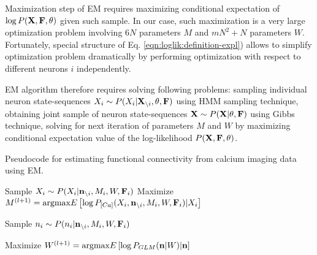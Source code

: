 Maximization step of EM requires maximizing conditional expectation of $\log P({\bf X}, {\bf F}, \mathbf{\theta})$ given such sample. In our case, such maximization is a very large optimization problem involving $6N$ parameters $M$ and $mN^2+N$ parameters $W$. Fortunately, special structure of Eq. \eqref{eqn:loglik:definition-expl}) allows to simplify optimization problem dramatically by performing optimization with respect to different neurons $i$ independently.

EM algorithm therefore requires solving following problems: sampling individual neuron state-sequences $X_i\sim P(X_{i}|{\bf X}_{\backslash i}, \mathbf{\theta}, {\bf F})$ using HMM sampling technique, obtaining joint sample of neuron state-sequences ${\bf X}\sim P({\bf X}|\mathbf{\theta}, {\bf F})$ using Gibbs technique, solving for next iteration of parameters $M$ and $W$ by maximizing conditional expectation value of the log-likelihood $P({\bf X}, {\bf F}, \mathbf{\theta})$.

\begin{algorithm}
\caption{Pseudocode for estimating functional connectivity from calcium imaging data using EM.}\label{eqn:pseudocode}
\begin{algorithmic}
      \State Sample $X_i \sim P(X_i|{\bf n}_{\backslash i}, M_i, W, {\bf F}_i)$
      \State Maximize $M^{(l+1)}=\text{argmax} E\left[\log P_{[Ca]}(X_i, {\bf n}_{\backslash i}, M_i, W, {\bf F}_i)|X_i\right]$
    \EndWhile
  \EndFor
  
      \State Sample $n_i \sim P(n_i|{\bf n}_{\backslash i}, M_i, W, {\bf F}_i)$
    \EndFor
  \EndFor 

  \State Maximize $W^{(l+1)}=\text{argmax} E\left[\log P_{GLM}({\bf n}|W)|{\bf n}\right]$  
\EndWhile
\end{algorithmic}
\end{algorithm}
